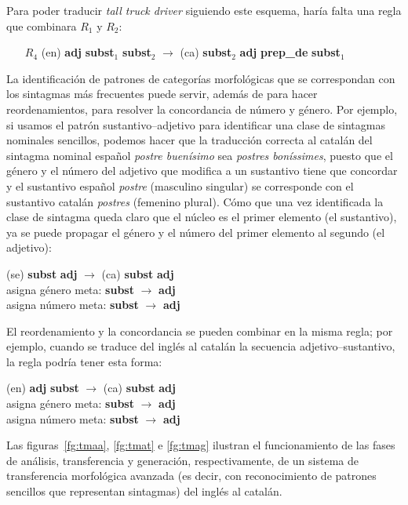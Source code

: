 Para poder traducir \emph{tall truck driver} siguiendo este esquema, haría falta una regla que combinara \(R_1\) y \(R_2\): \begin{itemize} \item[$R_4$] (en) \textbf{adj} \textbf{subst}$_1$ \textbf{subst}$_2$ $\rightarrow$ (ca) \textbf{subst}$_2$ \textbf{adj} \textbf{prep\_de} \textbf{subst}$_1$ \end{itemize} 

La identificación de patrones de categorías morfológicas que se correspondan con los sintagmas más frecuentes puede servir, además de para hacer reordenamientos, para resolver la concordancia de número y género. Por ejemplo, si usamos el patrón sustantivo--adjetivo para identificar una clase de sintagmas nominales sencillos, podemos hacer que la traducción correcta al catalán del sintagma nominal español {\em postre buenísimo} sea \emph{postres boníssimes}, puesto que el género y el número del adjetivo que modifica a un sustantivo tiene que concordar y el sustantivo español \emph{postre} (masculino singular) se corresponde con el sustantivo catalán \emph{postres} (femenino plural). Cómo que una vez identificada la clase de sintagma queda claro que el núcleo es el primer elemento (el sustantivo), ya se puede propagar el género y el número del primer elemento al segundo (el adjetivo): \begin{center} (se) \textbf{subst} \textbf{adj} \(\to\) (ca) \textbf{subst} \textbf{adj} \\ asigna género meta: \textbf{subst} \(\to\) \textbf{adj}\\ asigna número meta: \textbf{subst} \(\to\) \textbf{adj} \end{center} 

El reordenamiento y la concordancia se pueden combinar en la misma regla; por ejemplo, cuando se traduce del inglés al catalán la secuencia adjetivo--sustantivo, la regla podría tener esta forma: \begin{center} (en) \textbf{adj} \textbf{subst} \(\to\) (ca) \textbf{subst} \textbf{adj} \\ asigna género meta: \textbf{subst} \(\to\) \textbf{adj}\\ asigna número meta: \textbf{subst} \(\to\) \textbf{adj} \end{center} 

Las figuras~\ref{fg:tmaa}, \ref{fg:tmat} e \ref{fg:tmag} ilustran el funcionamiento de las fases de análisis, transferencia y generación, respectivamente, de un sistema de transferencia morfológica avanzada (es decir, con reconocimiento de patrones sencillos que representan sintagmas) del inglés al catalán. 

